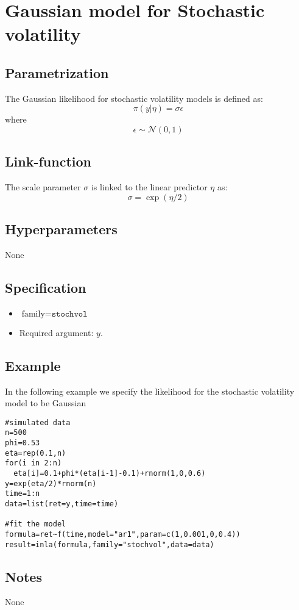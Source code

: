 \documentclass[a4paper,11pt]{article}
\begin{document}
\section*{Gaussian model for Stochastic volatility}

\subsection*{Parametrization}

The Gaussian likelihood for stochastic volatility models is defined as:
\[
\pi(y |\eta )=\sigma \epsilon 
\]
where
\[
\epsilon \sim\mathcal{N}(0,1)
\]

\subsection*{Link-function}

The scale parameter $\sigma $ is linked to the linear predictor $\eta $ as:
\[
\sigma =\exp(\eta /2)
\]


\subsection*{Hyperparameters}

None

\subsection*{Specification}

\begin{itemize}
\item $\text{family}=\texttt{stochvol}$
\item Required argument: $y$.
\end{itemize}

\subsection*{Example}
In the following example we specify the likelihood for the stochastic volatility model to be Gaussian 
 
\begin{verbatim}
#simulated data
n=500
phi=0.53
eta=rep(0.1,n)
for(i in 2:n)
  eta[i]=0.1+phi*(eta[i-1]-0.1)+rnorm(1,0,0.6)
y=exp(eta/2)*rnorm(n)
time=1:n
data=list(ret=y,time=time)

#fit the model
formula=ret~f(time,model="ar1",param=c(1,0.001,0,0.4))
result=inla(formula,family="stochvol",data=data)

\end{verbatim}

\subsection*{Notes}

None
\end{document}

